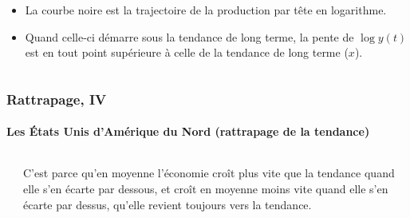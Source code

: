 \documentclass[10pt,notheorems]{beamer}
\theoremstyle{plain}
\theoremstyle{definition} %
\begin{document}
\begin{frame}
\begin{itemize}
\begin{columns}
\begin{column}{0.5\textwidth}
\begin{itemize}
        \item La courbe noire est la trajectoire de la production par tête en logarithme.\newline

        \item Quand celle-ci démarre sous la tendance de long terme, la pente de $\log y(t)$ est en tout point supérieure à
          celle de la tendance de long terme ($x$).

        \end{itemize}
      \end{column}
    \end{columns}

  \end{itemize}

\end{frame}


\begin{frame}
  \frametitle{Rattrapage, IV}
  \framesubtitle{Les États Unis d'Amérique du Nord (rattrapage de la tendance)}

  \begin{columns}
      \begin{column}{0.8\textwidth}
        
      \end{column}
      \begin{column}{0.2\textwidth}
        \footnotesize{
        C'est parce qu'en moyenne l'économie croît plus vite que la tendance
        quand elle s'en écarte par dessous, et croît en moyenne moins vite quand
        elle s'en écarte par dessus, qu'elle revient toujours vers la tendance.}
      \end{column}
    \end{columns}
\end{frame}
\end{document}
